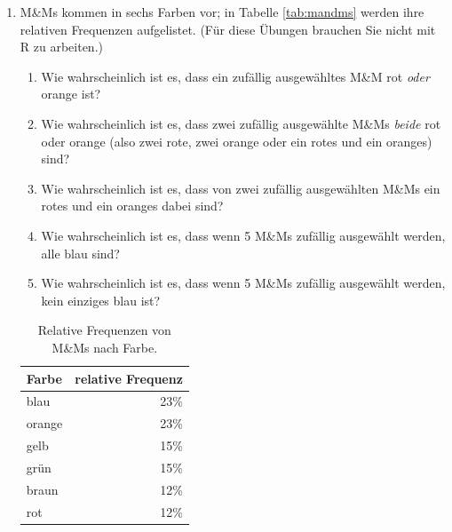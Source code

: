 \documentclass[oneside, 10pt]{book}\usepackage[]{graphicx}\usepackage[]{xcolor}
\begin{document}
\begin{enumerate}

\item M{\&}Ms kommen in sechs Farben vor; in Tabelle \vref{tab:mandms} werden ihre relativen Frequenzen aufgelistet. (Für diese Übungen brauchen Sie nicht mit R zu arbeiten.)

\begin{enumerate}
\item Wie wahrscheinlich ist es, dass ein zufällig ausgewähltes M{\&}M rot \emph{oder} orange ist?
\item Wie wahrscheinlich ist es, dass zwei zufällig ausgewählte M{\&}Ms \emph{beide} rot oder orange (also zwei rote, zwei orange oder ein rotes und ein oranges) sind?
\item Wie wahrscheinlich ist es, dass von zwei zufällig ausgewählten M{\&}Ms ein rotes und ein oranges dabei sind?
\item Wie wahrscheinlich ist es, dass wenn 5 M{\&}Ms zufällig ausgewählt werden, alle blau sind?
\item Wie wahrscheinlich ist es, dass wenn 5 M{\&}Ms zufällig ausgewählt werden, kein einziges blau ist?\label{ex:mm}
\end{enumerate}

\begin{table}[tbp]
\centering
\caption{Relative Frequenzen von M\&Ms nach Farbe.}
\label{tab:mandms}
\begin{tabular}{@{}lr@{}}
\toprule
Farbe  & relative Frequenz \\ \midrule
blau   & 23\%              \\
orange & 23\%              \\
gelb   & 15\% \\
grün   & 15\% \\
braun  & 12\% \\
rot    & 12\% \\
\bottomrule
\end{tabular}
\end{table}


\end{enumerate}
\end{document}
